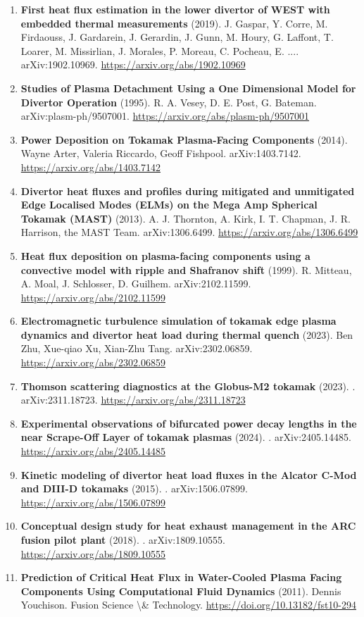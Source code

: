 \documentclass[11pt,a4paper]{article}
\begin{document}
\begin{enumerate}[leftmargin=1.4em]
\item \textbf{First heat flux estimation in the lower divertor of WEST with embedded thermal measurements} (2019). J. Gaspar, Y. Corre, M. Firdaouss, J. Gardarein, J. Gerardin, J. Gunn, M. Houry, G. Laffont, T. Loarer, M. Missirlian, J. Morales, P. Moreau, C. Pocheau, E. .... arXiv:1902.10969. \url{https://arxiv.org/abs/1902.10969}
\item \textbf{Studies of Plasma Detachment Using a One Dimensional Model for Divertor Operation} (1995). R. A. Vesey, D. E. Post, G. Bateman. arXiv:plasm-ph/9507001. \url{https://arxiv.org/abs/plasm-ph/9507001}
\item \textbf{Power Deposition on Tokamak Plasma-Facing Components} (2014). Wayne Arter, Valeria Riccardo, Geoff Fishpool. arXiv:1403.7142. \url{https://arxiv.org/abs/1403.7142}
\item \textbf{Divertor heat fluxes and profiles during mitigated and unmitigated Edge Localised Modes (ELMs) on the Mega Amp Spherical Tokamak (MAST)} (2013). A. J. Thornton, A. Kirk, I. T. Chapman, J. R. Harrison, the MAST Team. arXiv:1306.6499. \url{https://arxiv.org/abs/1306.6499}
\item \textbf{Heat flux deposition on plasma-facing components using a convective model with ripple and Shafranov shift} (1999). R. Mitteau, A. Moal, J. Schlosser, D. Guilhem. arXiv:2102.11599. \url{https://arxiv.org/abs/2102.11599}
\item \textbf{Electromagnetic turbulence simulation of tokamak edge plasma dynamics and divertor heat load during thermal quench} (2023). Ben Zhu, Xue-qiao Xu, Xian-Zhu Tang. arXiv:2302.06859. \url{https://arxiv.org/abs/2302.06859}
\item \textbf{Thomson scattering diagnostics at the Globus-M2 tokamak} (2023). . arXiv:2311.18723. \url{https://arxiv.org/abs/2311.18723}
\item \textbf{Experimental observations of bifurcated power decay lengths in the near Scrape-Off Layer of tokamak plasmas} (2024). . arXiv:2405.14485. \url{https://arxiv.org/abs/2405.14485}
\item \textbf{Kinetic modeling of divertor heat load fluxes in the Alcator C-Mod and DIII-D tokamaks} (2015). . arXiv:1506.07899. \url{https://arxiv.org/abs/1506.07899}
\item \textbf{Conceptual design study for heat exhaust management in the ARC fusion pilot plant} (2018). . arXiv:1809.10555. \url{https://arxiv.org/abs/1809.10555}
\item \textbf{Prediction of Critical Heat Flux in Water-Cooled Plasma Facing Components Using Computational Fluid Dynamics} (2011). Dennis Youchison. Fusion Science \textbackslash{}\& Technology. \url{https://doi.org/10.13182/fst10-294}

\end{enumerate}
\end{document}
